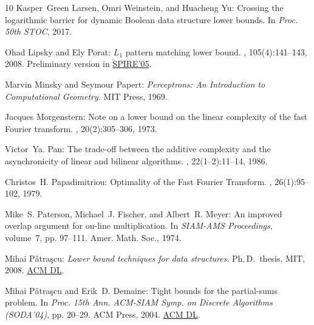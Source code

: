 \documentclass[11pt]{article}
\numberwithin{equation}{section}
\theoremstyle{definition}
\theoremstyle{plain}
\begin{document}
\begin{thebibliography}{10}
{\sc Kasper~Green Larsen, Omri Weinstein, and Huacheng Yu}: Crossing the
  logarithmic barrier for dynamic {B}oolean data structure lower bounds.
\newblock In {\em Proc. 50th STOC}, 2017.

{\sc Ohad Lipsky and Ely Porat}: {$L_1$} pattern matching lower bound.
, 105(4):141--143, 2008.
\newblock Preliminary version in
  \href{https://doi.org/10.1007/11575832\_36}{SPIRE'05}.

{\sc Marvin Minsky and Seymour Papert}: {\em Perceptrons: An Introduction to
  Computational Geometry}.
\newblock MIT Press, 1969.

{\sc Jacques Morgenstern}: Note on a lower bound on the linear complexity of
  the fast {F}ourier transform.
, 20(2):305--306, 1973.
\newblock [\epfmtdoi{10.1145/321752.321761}]

{\sc Victor~Ya. Pan}: The trade-off between the additive complexity and the
  asynchronicity of linear and bilinear algorithms.
, 22(1--2):11--14, 1986.
\newblock [\epfmtdoi{10.1016/0020-0190(86)90035-9}]

{\sc Christos~H. Papadimitriou}: Optimality of the {F}ast {F}ourier
  {T}ransform.
, 26(1):95--102, 1979.
\newblock [\epfmtdoi{10.1145/322108.322118}]

{\sc Mike~S. Paterson, Michael~J. Fischer, and Albert~R. Meyer}: An improved
  overlap argument for on-line multiplication.
\newblock In {\em SIAM-AMS Proceedings}, volume~7, pp. 97--111. Amer. Math.
  Soc., 1974.

{\sc Mihai P{\v{a}}tra\c{s}cu}: {\em Lower bound techniques for data
  structures}.
\newblock Ph.\,D.\ thesis, MIT, 2008.
\newblock \href{https://dl.acm.org/citation.cfm?id=1626626}{ACM DL}.

{\sc Mihai P{\v{a}}tra\c{s}cu and Erik~D. Demaine}: Tight bounds for the
  partial-sums problem.
\newblock In {\em Proc. 15th Ann. ACM-SIAM Symp. on Discrete Algorithms
  (SODA'04)}, pp. 20--29. ACM Press, 2004.
\newblock \href{https://dl.acm.org/citation.cfm?id=982792.982796}{ACM DL}.


\end{thebibliography}
\end{document}
